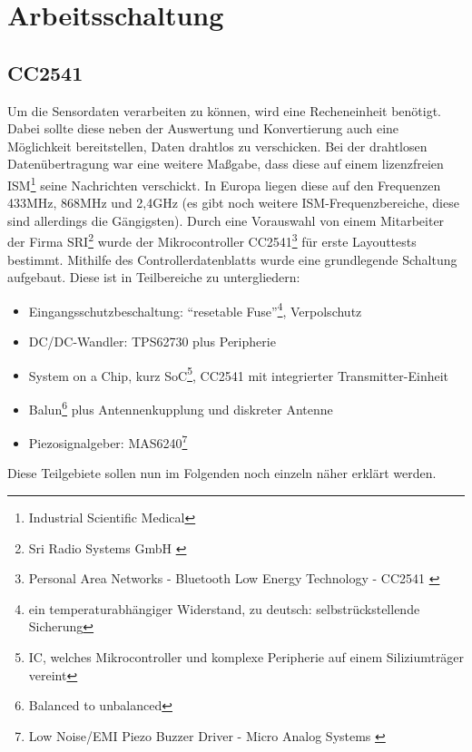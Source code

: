 \documentclass[12pt]{scrreprt} %
\begin{document}
\section{Arbeitsschaltung}
\subsection{CC2541}
\label{CC2541}
Um die Sensordaten verarbeiten zu können, wird eine Recheneinheit benötigt. Dabei sollte diese neben der Auswertung und Konvertierung auch eine Möglichkeit bereitstellen, Daten drahtlos zu verschicken. Bei der drahtlosen Datenübertragung war eine weitere Maßgabe, dass diese auf einem lizenzfreien ISM\footnote{Industrial Scientific Medical} seine Nachrichten verschickt. In Europa liegen diese auf den Frequenzen 433MHz, 868MHz und 2,4GHz (es gibt noch weitere ISM-Frequenzbereiche, diese sind allerdings die Gängigsten). Durch eine Vorauswahl von einem Mitarbeiter der Firma SRI\footnote{Sri Radio Systems GmbH \citep{SRI}} wurde der Mikrocontroller CC2541\footnote{Personal Area Networks - Bluetooth Low Energy Technology - CC2541 \citep{TICC2541}} für erste Layouttests bestimmt. Mithilfe des Controllerdatenblatts \citep{CC2541} wurde eine grundlegende Schaltung aufgebaut. Diese ist in Teilbereiche zu untergliedern:
\begin{itemize}
\item
Eingangsschutzbeschaltung:  "`resetable Fuse"'\footnote{ein temperaturabhängiger Widerstand, zu deutsch: selbstrückstellende Sicherung}, Verpolschutz
\item
DC/DC-Wandler: TPS62730 plus Peripherie
\item
System on a Chip, kurz SoC\footnote{IC, welches Mikrocontroller und komplexe Peripherie auf einem Siliziumträger vereint}, CC2541 mit integrierter Transmitter-Einheit
\item
Balun\footnote{Balanced to unbalanced} plus Antennenkupplung und diskreter Antenne
\item
Piezosignalgeber: MAS6240\footnote{Low Noise/EMI Piezo Buzzer Driver - Micro Analog Systems \citep{MAS}} 
\end{itemize}
Diese Teilgebiete sollen nun im Folgenden noch einzeln näher erklärt werden.
\end{document}
